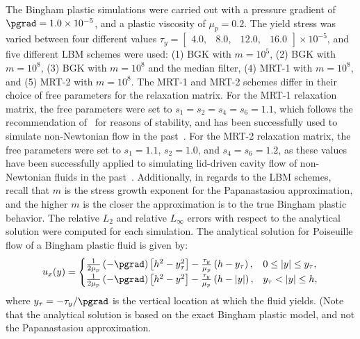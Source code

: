 The Bingham plastic simulations were carried out with a pressure gradient of $\pgrad = 1.0 \times 10^{-5}$, and a plastic viscosity of $\mu_p = 0.2$.
The yield stress was varied between four different values $\tau_y = \begin{bmatrix}4.0,&8.0,&12.0,&16.0\end{bmatrix} \times 10^{-5}$, and five different LBM schemes were used: (1) BGK with $m = 10^5$, (2) BGK with $m = 10^8$, (3) BGK with $m = 10^8$ and the median filter, (4) MRT-1 with $m = 10^8$, and (5) MRT-2 with $m = 10^8$.
The MRT-1 and MRT-2 schemes differ in their choice of free parameters for the relaxation matrix.
For the MRT-1 relaxation matrix, the free parameters were set to $s_1 = s_2 = s_4 = s_6 = 1.1$, which follows the recommendation of~\cite{lallemand2000theory} for reasons of stability, and has been successfully used to simulate non-Newtonian flow in the past~\cite{fallah2012multiple,grasinger2015simulation}. 
For the MRT-2 relaxation matrix, the free parameters were set to $s_1 = 1.1$, $s_2 = 1.0$, and $s_4 = s_6 = 1.2$, as these values have been successfully applied to simulating lid-driven cavity flow of non-Newtonian fluids in the past~\cite{chen2014simulations,li2014simulation}.
Additionally, in regards to the LBM schemes, recall that $m$ is the stress growth exponent for the Papanastasiou approximation, and the higher $m$ is the closer the approximation is to the true Bingham plastic behavior.
The relative $L_2$ and relative $L_{\infty}$ errors with respect to the analytical solution were computed for each simulation.
The analytical solution for Poiseuille flow of a Bingham plastic fluid is given by:
\begin{equation} \label{eq:analytical-bingham}
u_x(y) = \begin{cases}
\frac{1}{2 \mu_p} \left(-\pgrad\right) \left[h^2 - y_{\tau}^2 \right] - \frac{\tau_y}{\mu_p} \left(h - y_{\tau}\right), & 0 \leq |y| \leq y_{\tau}, \\
\frac{1}{2 \mu_p} \left(-\pgrad\right) \left[h^2 - y^2 \right] - \frac{\tau_y}{\mu_p} \left(h - |y|\right), & y_{\tau} < |y| \leq h,
\end{cases}
\end{equation}
\noindent where $y_{\tau} = -\tau_y / \pgrad$ is the vertical location at which the fluid yields.
(Note that the analytical solution is based on the exact Bingham plastic model, and not the Papanastasiou approximation.
